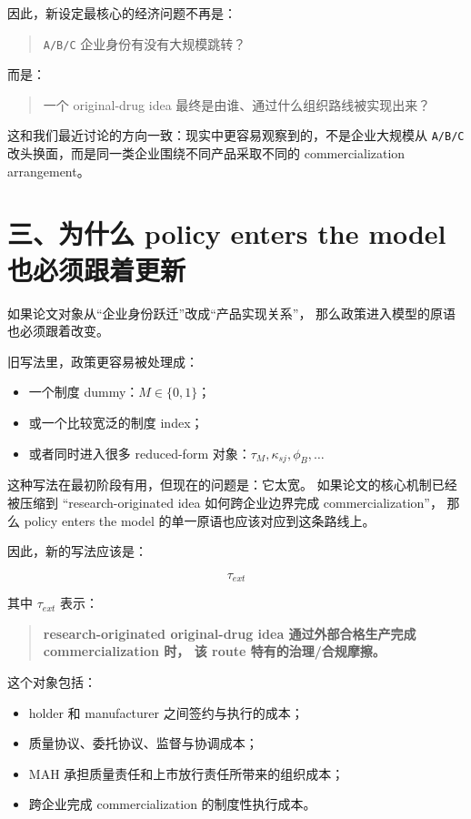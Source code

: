 \documentclass[12pt,fontset=none]{ctexart}
\begin{document}
因此，新设定最核心的经济问题不再是：

\begin{quote}
\texttt{A/B/C} 企业身份有没有大规模跳转？
\end{quote}

而是：

\begin{quote}
一个 original-drug idea 最终是由谁、通过什么组织路线被实现出来？
\end{quote}

这和我们最近讨论的方向一致：现实中更容易观察到的，不是企业大规模从
\texttt{A/B/C} 改头换面，而是同一类企业围绕不同产品采取不同的
commercialization arrangement。

\section{三、为什么 policy enters the model 也必须跟着更新}

如果论文对象从“企业身份跃迁”改成“产品实现关系”，
那么政策进入模型的原语也必须跟着改变。

旧写法里，政策更容易被处理成：

\begin{itemize}[leftmargin=2em]
    \item 一个制度 dummy：\(M\in\{0,1\}\)；
    \item 或一个比较宽泛的制度 index；
    \item 或者同时进入很多 reduced-form 对象：\(\tau_M,\kappa_{sj},\phi_B,\ldots\)
\end{itemize}

这种写法在最初阶段有用，但现在的问题是：它太宽。
如果论文的核心机制已经被压缩到
“research-originated idea 如何跨企业边界完成 commercialization”，
那么 policy enters the model 的单一原语也应该对应到这条路线上。

因此，新的写法应该是：

\[
\tau_{ext}
\]

其中 \(\tau_{ext}\) 表示：

\begin{quote}
\textbf{research-originated original-drug idea 通过外部合格生产完成 commercialization 时，
该 route 特有的治理/合规摩擦。}
\end{quote}

这个对象包括：

\begin{itemize}[leftmargin=2em]
    \item holder 和 manufacturer 之间签约与执行的成本；
    \item 质量协议、委托协议、监督与协调成本；
    \item MAH 承担质量责任和上市放行责任所带来的组织成本；
    \item 跨企业完成 commercialization 的制度性执行成本。
\end{itemize}
\end{document}
